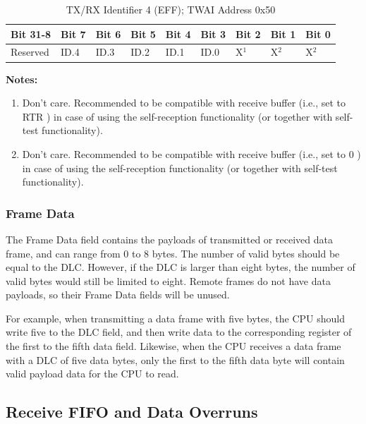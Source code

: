 \documentclass[main\_\_EN.tex]{subfiles}
\begin{document}
\begin{longtable}[c]{|p{1.4cm}|p{1.4cm}|p{1.4cm}|p{1.4cm}|p{1.4cm}|p{1.4cm}|p{1.4cm}|p{1.4cm}|p{1.4cm}|}
    \caption{TX/RX Identifier 4 (EFF); TWAI Address 0x50}
    \label{tab:twai-tx-rx-identifier-4-eff}\\
    \hline
       \rowcolor{lightgray}
    \textbf{Bit 31-8} & \textbf{Bit 7} & \textbf{Bit 6} & \textbf{Bit 5} & \textbf{Bit 4} & \textbf{Bit 3} & \textbf{Bit 2} & \textbf{Bit 1} & \textbf{Bit 0}\\\hline
    Reserved & ID.4 & ID.3 & ID.2 & ID.1 & ID.0 & X$^1$ & X$^2$ & X$^2$\\
    \hline
\end{longtable}
\vspace{-1.5em}
{\bfseries Notes:}\\
\begin{enumerate}
    \item Don't care. Recommended to be compatible with receive buffer (i.e., set to RTR ) in case of using the self-reception functionality (or together with self-test functionality).
    \item Don't care. Recommended to be compatible with receive buffer (i.e., set to 0 ) in case of using the self-reception functionality (or together with self-test functionality).
\end{enumerate}

\subsubsection{Frame Data}
The Frame Data field contains the payloads of transmitted or received data frame, and can range from 0 to 8 bytes. The number of valid bytes should be equal to the DLC. However, if the DLC is larger than eight bytes, the number of valid bytes would still be limited to eight. Remote frames do not have data payloads, so their Frame Data fields will be unused.

For example, when transmitting a data frame with five bytes, the CPU should write five to the DLC field, and then write data to the corresponding register of the first to the fifth data field. Likewise, when the CPU receives a data frame with a DLC of five data bytes, only the first to the fifth data byte will contain valid payload data for the CPU to read.

\subsection{Receive FIFO and Data Overruns}
\end{document}
